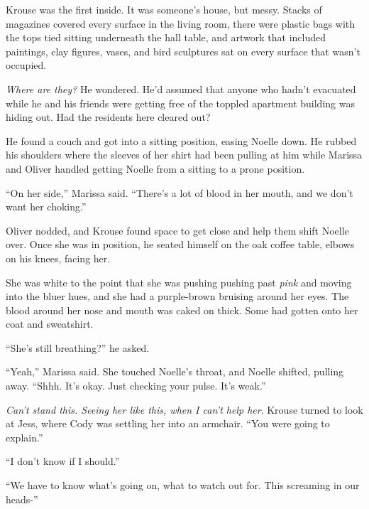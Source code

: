 Krouse was the first inside.  It was someone's house, but messy.  Stacks of magazines covered every surface in the living room, there were plastic bags with the tops tied sitting underneath the hall table, and artwork that included paintings, clay figures, vases, and bird sculptures sat on every surface that wasn't occupied.



\emph{Where are they?  }He wondered.  He'd assumed that anyone who hadn't evacuated while he and his friends were getting free of the toppled apartment building was hiding out.  Had the residents here cleared out?



He found a couch and got into a sitting position, easing Noelle down.  He rubbed his shoulders where the sleeves of her shirt had been pulling at him while Marissa and Oliver handled getting Noelle from a sitting to a prone position.



``On her side,'' Marissa said.  ``There's a lot of blood in her mouth, and we don't want her choking.''



Oliver nodded, and Krouse found space to get close and help them shift Noelle over.  Once she was in position, he seated himself on the oak coffee table, elbows on his knees, facing her.



She was white to the point that she was pushing pushing past \emph{pink} and moving into the bluer hues, and she had a purple-brown bruising around her eyes.  The blood around her nose and mouth was caked on thick.  Some had gotten onto her coat and sweatshirt.



``She's still breathing?'' he asked.



``Yeah,'' Marissa said.  She touched Noelle's throat, and Noelle shifted, pulling away.  ``Shhh.  It's okay.  Just checking your pulse.  It's weak.''



\emph{Can't stand this.  Seeing her like this, when I can't help her}.  Krouse turned to look at Jess, where Cody was settling her into an armchair.  ``You were going to explain.''



``I don't know if I should.''



``We have to know what's going on, what to watch out for.  This screaming in our heads-''



